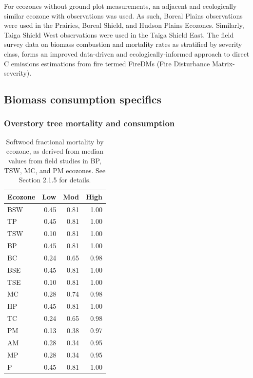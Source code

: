 \documentclass[, manuscript]{copernicus}
\begin{document}
For ecozones without ground plot measurements, an adjacent and
ecologically similar ecozone with observations was used. As such, Boreal
Plains observations were used in the Prairies, Boreal Shield, and Hudson
Plains Ecozones. Similarly, Taiga Shield West observations were used in
the Taiga Shield East. The field survey data on biomass combustion and
mortality rates as stratified by severity class, forms an improved
data-driven and ecologically-informed approach to direct C emissions
estimations from fire termed FireDMs (Fire Disturbance Matrix-severity).

\subsection{Biomass consumption specifics}

\subsubsection{Overstory tree mortality and consumption}

\begin{table}
\centering
\caption{\label{tab:tab-MortByEcozone}Softwood fractional mortality by ecozone, as derived from median values from field studies in BP, TSW, MC, and PM ecozones.  See Section 2.1.5 for details.}
\centering
\begin{tabular}[t]{l|r|r|r}
\hline
Ecozone & Low & Mod & High\\
\hline
BSW & 0.45 & 0.81 & 1.00\\
\hline
TP & 0.45 & 0.81 & 1.00\\
\hline
TSW & 0.10 & 0.81 & 1.00\\
\hline
BP & 0.45 & 0.81 & 1.00\\
\hline
BC & 0.24 & 0.65 & 0.98\\
\hline
BSE & 0.45 & 0.81 & 1.00\\
\hline
TSE & 0.10 & 0.81 & 1.00\\
\hline
MC & 0.28 & 0.74 & 0.98\\
\hline
HP & 0.45 & 0.81 & 1.00\\
\hline
TC & 0.24 & 0.65 & 0.98\\
\hline
PM & 0.13 & 0.38 & 0.97\\
\hline
AM & 0.28 & 0.34 & 0.95\\
\hline
MP & 0.28 & 0.34 & 0.95\\
\hline
P & 0.45 & 0.81 & 1.00\\
\hline
\end{tabular}
\end{table}
\end{document}

